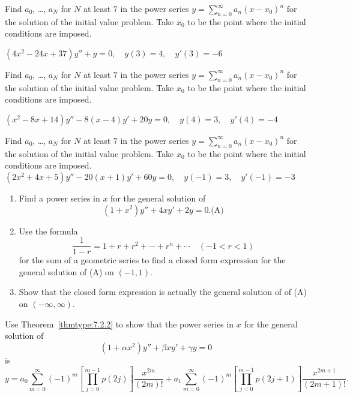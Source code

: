 \documentclass{ximera}
\begin{document}
\begin{problem}\label{exer:7.2.24}  Find $a_0$, \dots, $a_N$ for $N$ at least $7$ in the power series
$y=\sum_{n=0}^\infty a_n(x-x_0)^n$
 for the  solution of the initial value problem.  Take $x_0$ to be the
point where the initial conditions are imposed.

$(4x^2-24x+37)y''+y=0,\quad y(3)=4,\quad
y'(3)=-6$
\end{problem}

\begin{problem}\label{exer:7.2.25}  Find $a_0$, \dots, $a_N$ for $N$ at least $7$ in the power series
$y=\sum_{n=0}^\infty a_n(x-x_0)^n$
 for the  solution of the initial value problem.  Take $x_0$ to be the
point where the initial conditions are imposed.

$(x^2-8x+14)y''-8(x-4)y'+20y=0,\quad
y(4)=3,\quad y'(4)=-4$
\end{problem}

\begin{problem}\label{exer:7.2.26}  Find $a_0$, \dots, $a_N$ for $N$ at least $7$ in the power series
$y=\sum_{n=0}^\infty a_n(x-x_0)^n$
 for the  solution of the initial value problem.  Take $x_0$ to be the
point where the initial conditions are imposed.
$(2x^2+4x+5)y''-20(x+1)y'+60y=0,\quad y(-1)=3,\quad y'(-1)=-3$
\end{problem}

\begin{problem}\label{exer:7.2.27}
\begin{enumerate}
\item %
Find a power series in $x$ for the general solution of
$$
(1+x^2)y''+4xy'+2y=0.
\text{(A)}
$$
\item %
Use the formula
$$
\frac{1}{1-r}=1+r+r^2+\cdots+r^n+\cdots \quad(-1<r<1)
$$
for the sum of a geometric series to find a closed form expression for
the general solution of (A) on $(-1,1)$.
\item %
Show that the closed form expression is actually the general
solution of of (A) on $(-\infty,\infty)$.
\end{enumerate}
\end{problem}

\begin{problem}\label{exer:7.2.28}
Use Theorem~\ref{thmtype:7.2.2} to show that the power series in
$x$ for the general solution of
$$
(1+\alpha x^2)y''+\beta xy'+\gamma y=0
$$
is
$$
y=a_0\sum^\infty_{m=0}(-1)^m \left[\prod^{m-1}_{j=0}
p(2j)\right] \frac{x^{2m}}{(2m)!} +
a_1\sum^\infty_{m=0}(-1)^m
\left[\prod^{m-1}_{j=0}p(2j+1)\right]
\frac{x^{2m+1}}{(2m+1)!}.
$$
\end{problem}
\end{document}
